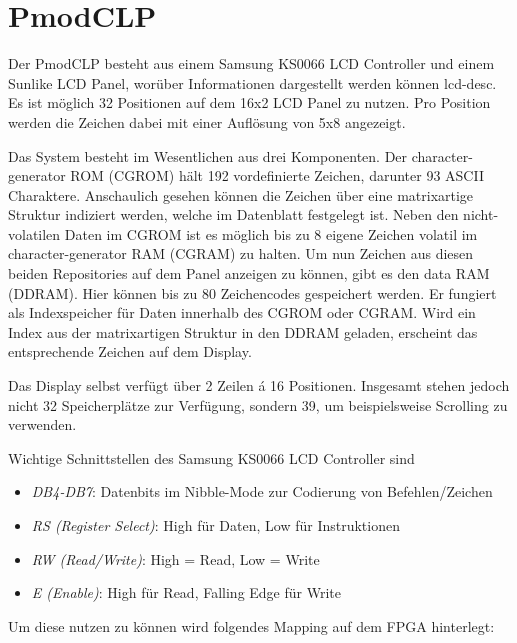 \chapter{PmodCLP}

Der PmodCLP besteht aus einem Samsung KS0066 LCD Controller und einem Sunlike LCD Panel, worüber Informationen dargestellt werden können {lcd-desc}. Es ist möglich 32 Positionen auf dem 16x2 LCD Panel zu nutzen. Pro Position werden die Zeichen dabei mit einer Auflösung von 5x8 angezeigt. \newline

Das System besteht im Wesentlichen aus drei Komponenten. Der character-generator ROM (CGROM) hält 192 vordefinierte Zeichen, darunter 93 ASCII Charaktere. Anschaulich gesehen können die Zeichen über eine matrixartige Struktur indiziert werden, welche im Datenblatt festgelegt ist. Neben den nicht-volatilen Daten im CGROM ist es möglich bis zu 8 eigene Zeichen volatil im character-generator RAM (CGRAM) zu halten. Um nun Zeichen aus diesen beiden Repositories auf dem Panel anzeigen zu können, gibt es den data RAM (DDRAM). Hier können bis zu 80 Zeichencodes gespeichert werden. Er fungiert als Indexspeicher für Daten innerhalb des CGROM oder CGRAM. Wird ein Index aus der matrixartigen Struktur in den DDRAM geladen, erscheint das entsprechende Zeichen auf dem Display. \newline

Das Display selbst verfügt über 2 Zeilen á 16 Positionen. Insgesamt stehen jedoch nicht 32 Speicherplätze zur Verfügung, sondern 39, um beispielsweise Scrolling zu verwenden. \newline

Wichtige Schnittstellen des Samsung KS0066 LCD Controller sind

\begin{itemize}
    \item \textit{DB4-DB7}: Datenbits im Nibble-Mode zur Codierung von Befehlen/Zeichen
    \item \textit{RS (Register Select)}: High für Daten, Low für Instruktionen
    \item \textit{RW (Read/Write)}: High = Read, Low = Write
    \item \textit{E (Enable)}: High für Read, Falling Edge für Write
\end{itemize}

Um diese nutzen zu können wird folgendes Mapping auf dem FPGA hinterlegt:\newline

